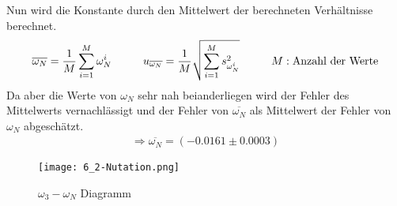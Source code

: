 Nun wird die Konstante durch den Mittelwert der berechneten Verhältnisse berechnet.
\begin{align}   
    \overline{\omega_N} = \frac{1}{M}\sum_{i=1}^{M}\omega_N^i \tab u_{\overline{\omega_N}}= \frac{1}{M}\sqrt{\sum_{i=1}^{M}s_{\omega_N^i}^2} \tab M:\text{Anzahl der Werte}
\end{align}
Da aber die Werte von $\omega_N$ sehr nah beianderliegen wird der Fehler des Mittelwerts vernachlässigt und der Fehler von $\overline{\omega_N}$ als Mittelwert der Fehler von $\omega_N$ abgeschätzt.
\begin{align*}
    \Rightarrow\boxed{\overline{\omega_N}=(-0.0161\pm0.0003)}
\end{align*}
\newpage
\begin{figure}[ht]
    \centering
    \caption{$\omega_3-\omega_N$ Diagramm}
    \texttt{[image: 6\_2-Nutation.png]}
\end{figure}